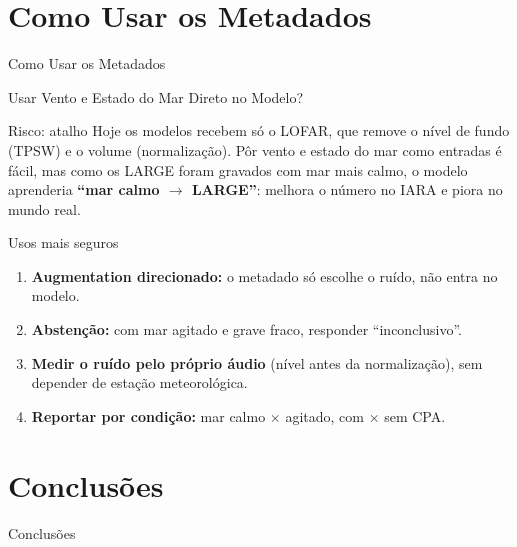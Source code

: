 \documentclass[aspectratio=169]{beamer}
\begin{document}
\section{Como Usar os Metadados}

\begin{frame}
    \centering
    \huge Como Usar os Metadados
\end{frame}

\begin{frame}{Usar Vento e Estado do Mar Direto no Modelo?}
    \footnotesize
    \begin{alertblock}{\small Risco: atalho}
        \scriptsize
        Hoje os modelos recebem só o LOFAR, que remove o nível de fundo (TPSW) e o volume (normalização). Pôr vento e estado do mar como entradas é fácil, mas como os LARGE foram gravados com mar mais calmo, o modelo aprenderia \textbf{``mar calmo $\rightarrow$ LARGE''}: melhora o número no IARA e piora no mundo real.
    \end{alertblock}
    \begin{block}{\small Usos mais seguros}
        \scriptsize
        \begin{enumerate}
            \setlength{\itemsep}{2pt}
            \item \textbf{Augmentation direcionado:} o metadado só escolhe o ruído, não entra no modelo.
            \item \textbf{Abstenção:} com mar agitado e grave fraco, responder ``inconclusivo''.
            \item \textbf{Medir o ruído pelo próprio áudio} (nível antes da normalização), sem depender de estação meteorológica.
            \item \textbf{Reportar por condição:} mar calmo $\times$ agitado, com $\times$ sem CPA.
        \end{enumerate}
    \end{block}
\end{frame}

\section{Conclusões}

\begin{frame}
    \centering
    \huge Conclusões
\end{frame}
\end{document}
